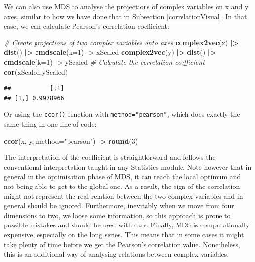 \documentclass[
]{book}
\newenvironment{Shaded}{\begin{snugshade}}{\end{snugshade}}
\newcommand{\CommentTok}[1]{\textcolor[rgb]{0.56,0.35,0.01}{\textit{#1}}}
\newcommand{\DataTypeTok}[1]{\textcolor[rgb]{0.13,0.29,0.53}{#1}}
\newcommand{\DecValTok}[1]{\textcolor[rgb]{0.00,0.00,0.81}{#1}}
\newcommand{\ErrorTok}[1]{\textcolor[rgb]{0.64,0.00,0.00}{\textbf{#1}}}
\newcommand{\KeywordTok}[1]{\textcolor[rgb]{0.13,0.29,0.53}{\textbf{#1}}}
\newcommand{\NormalTok}[1]{#1}
\newcommand{\OperatorTok}[1]{\textcolor[rgb]{0.81,0.36,0.00}{\textbf{#1}}}
\newcommand{\StringTok}[1]{\textcolor[rgb]{0.31,0.60,0.02}{#1}}
\begin{document}
We can also use MDS to analyse the projections of complex variables on x and y axes, similar to how we have done that in Subsection \ref{correlationVisual}. In that case, we can calculate Pearson's correlation coefficient:

\begin{Shaded}
\begin{Highlighting}[]
\CommentTok{\# Create projections of two complex variables onto axes}
\KeywordTok{complex2vec}\NormalTok{(x) }\OperatorTok{|}\ErrorTok{\textgreater{}}\StringTok{ }\KeywordTok{dist}\NormalTok{() }\OperatorTok{|}\ErrorTok{\textgreater{}}\StringTok{ }\KeywordTok{cmdscale}\NormalTok{(}\DataTypeTok{k=}\DecValTok{1}\NormalTok{) {-}\textgreater{}}\StringTok{ }\NormalTok{xScaled}
\KeywordTok{complex2vec}\NormalTok{(y) }\OperatorTok{|}\ErrorTok{\textgreater{}}\StringTok{ }\KeywordTok{dist}\NormalTok{() }\OperatorTok{|}\ErrorTok{\textgreater{}}\StringTok{ }\KeywordTok{cmdscale}\NormalTok{(}\DataTypeTok{k=}\DecValTok{1}\NormalTok{) {-}\textgreater{}}\StringTok{ }\NormalTok{yScaled}
\CommentTok{\# Calculate the correlation coefficient}
\KeywordTok{cor}\NormalTok{(xScaled,yScaled)}
\end{Highlighting}
\end{Shaded}

\begin{verbatim}
##           [,1]
## [1,] 0.9978966
\end{verbatim}

Or using the \texttt{ccor()} function with \texttt{method="pearson"}, which does exactly the same thing in one line of code:

\begin{Shaded}
\begin{Highlighting}[]
\KeywordTok{ccor}\NormalTok{(x, y, }\DataTypeTok{method=}\StringTok{"pearson"}\NormalTok{) }\OperatorTok{|}\ErrorTok{\textgreater{}}\StringTok{ }\KeywordTok{round}\NormalTok{(}\DecValTok{3}\NormalTok{)}
\end{Highlighting}
\end{Shaded}

The interpretation of the coefficient is straightforward and follows the conventional interpretation taught in any Statistics module. Note however that in general in the optimisation phase of MDS, it can reach the local optimum and not being able to get to the global one. As a result, the sign of the correlation might not represent the real relation between the two complex variables and in general should be ignored. Furthermore, inevitably when we move from four dimensions to two, we loose some information, so this approach is prone to possible mistakes and should be used with care. Finally, MDS is computationally expensive, especially on the long series. This means that in some cases it might take plenty of time before we get the Pearson's correlation value. Nonetheless, this is an additional way of analysing relations between complex variables.
\end{document}
